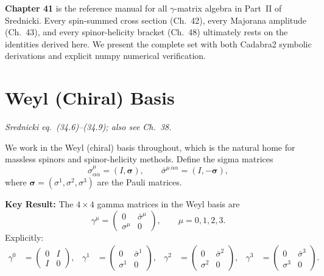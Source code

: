 \begin{mdframed}[backgroundcolor=blue!5]
\textbf{Chapter 41} is the reference manual for all $\gamma$-matrix algebra in
Part~II of Srednicki.  Every spin-summed cross section (Ch.~42), every Majorana
amplitude (Ch.~43), and every spinor-helicity bracket (Ch.~48) ultimately rests
on the identities derived here.  We present the complete set with both
Cadabra2 symbolic derivations and explicit numpy numerical verification.
\end{mdframed}

\section{Weyl (Chiral) Basis}

\textit{Srednicki eq.\ (34.6)--(34.9); also see Ch.~38.}

We work in the Weyl (chiral) basis throughout, which is the natural home for
massless spinors and spinor-helicity methods.  Define the sigma matrices
\begin{equation}
  \sigma^\mu_{\alpha\dot\alpha} = (I, \boldsymbol{\sigma}),
  \qquad
  \bar\sigma^{\mu\,\dot\alpha\alpha} = (I, -\boldsymbol{\sigma}),
\end{equation}
where $\boldsymbol{\sigma} = (\sigma^1,\sigma^2,\sigma^3)$ are the Pauli matrices.

\begin{mdframed}[backgroundcolor=blue!5]
\textbf{Key Result:} The $4\times4$ gamma matrices in the Weyl basis are
\begin{equation}\label{eq:weyl-gamma}
  \gamma^\mu = \begin{pmatrix} 0 & \bar\sigma^\mu \\ \sigma^\mu & 0 \end{pmatrix},
  \qquad \mu = 0,1,2,3.
\end{equation}
Explicitly:
\begin{align}
  \gamma^0 &= \begin{pmatrix}0&I\\I&0\end{pmatrix}, &
  \gamma^1 &= \begin{pmatrix}0&\bar\sigma^1\\\sigma^1&0\end{pmatrix}, &
  \gamma^2 &= \begin{pmatrix}0&\bar\sigma^2\\\sigma^2&0\end{pmatrix}, &
  \gamma^3 &= \begin{pmatrix}0&\bar\sigma^3\\\sigma^3&0\end{pmatrix}.
\end{align}
\end{mdframed}

